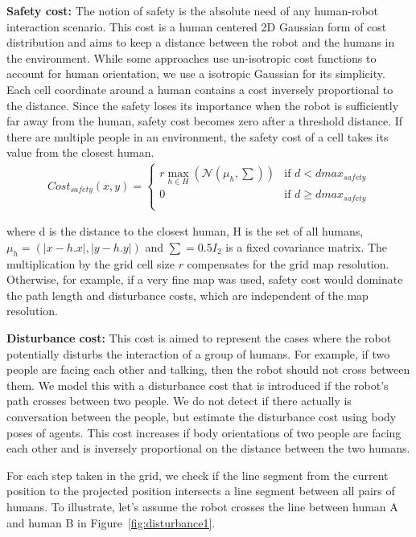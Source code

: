 \textbf{Safety cost:} The notion of safety is the absolute need of any human-robot interaction scenario. This cost is a human centered 2D Gaussian form of cost distribution and aims to keep a distance between the robot and the humans in the environment. While some approaches use un-isotropic cost functions to account for human orientation, we use a isotropic Gaussian for its simplicity. Each cell coordinate around a human contains a cost inversely proportional to the distance. Since the safety loses its importance when the robot is sufficiently far away from the human, safety cost becomes zero after a threshold distance. If there are multiple people in an environment, the safety cost of a cell takes its value from the closest human.
\begin{align}
Cost_{safety}(x,y)=\left\{ \begin{array}{cl}
r\max_{h\in H}(\mathcal{N}(\mu_h,\sum)) & \textrm{if $d<dmax_{safety}$}\\
0 & \textrm{if $d\geq dmax_{safety}$}\\
\end{array}\right.
\end{align}

where d is the distance to the closest human, H is the set of all humans, $\mu_h = (|x - h.x|,|y - h.y|)$ and $\sum = 0.5I_2$ is a fixed covariance matrix. The multiplication by the grid cell size $r$ compensates for the grid map resolution. Otherwise, for example, if a very fine map was used, safety cost would dominate the path length and disturbance costs, which are independent of the map resolution.
 
\textbf{Disturbance cost:} This cost is aimed to represent the cases where the robot potentially disturbs the interaction of a group of humans. For example, if two people are facing each other and talking, then the robot should not cross between them.  We model this with a disturbance cost that is introduced if the robot's path crosses between two people. We do not detect if there actually is conversation between the people, but estimate the disturbance cost using body poses of agents. This cost increases if body orientations of two people are facing each other and is inversely proportional on the distance between the two humans.

For each step taken in the grid, we check if the line segment from the current position to the  projected position intersects a line segment between all pairs of humans. To illustrate, let's assume the robot crosses the line between human A and human B in Figure~\ref{fig:disturbance1}. 

